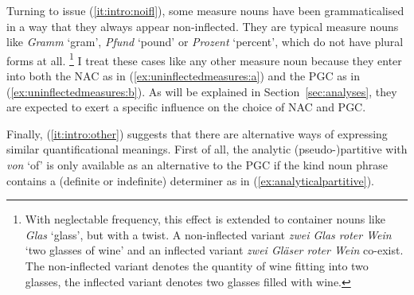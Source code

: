 \documentclass[USenglish]{article}
\begin{document}
Turning to issue (\ref{it:intro:noifl}), some measure nouns have been grammaticalised in a way that they always appear non-inflected.
They are typical measure nouns like \textit{Gramm} `gram', \textit{Pfund} `pound' or \textit{Prozent} `percent', which do not have plural forms at all.%
\footnote{With neglectable frequency, this effect is extended to container nouns like \textit{Glas} `glass', but with a twist.
A non-inflected variant \textit{zwei Glas roter Wein} `two glasses of wine' and an inflected variant \textit{zwei Gläser roter Wein} co-exist.
The non-inflected variant denotes the quantity of wine fitting into two glasses, the inflected variant denotes two glasses filled with wine.}
I treat these cases like any other measure noun because they enter into both the NAC as in (\ref{ex:uninflectedmeasures:a}) and the PGC as in (\ref{ex:uninflectedmeasures:b}).
As will be explained in Section~\ref{sec:analyses}, they are expected to exert a specific influence on the choice of NAC and PGC.

\begin{exe}
  \ex\label{ex:uninflectedmeasures}
  \begin{xlist}
  \end{xlist}
\end{exe}

Finally, (\ref{it:intro:other}) suggests that there are alternative ways of expressing similar quantificational meanings.
First of all, the analytic (pseudo-)partitive with \textit{von} `of' is only available as an alternative to the PGC if the kind noun phrase contains a (definite or indefinite) determiner as in (\ref{ex:analyticalpartitive}).

\begin{exe}
  \ex\label{ex:analyticalpartitive} 
  \begin{xlist}
  \end{xlist}
\end{exe}
\end{document}
